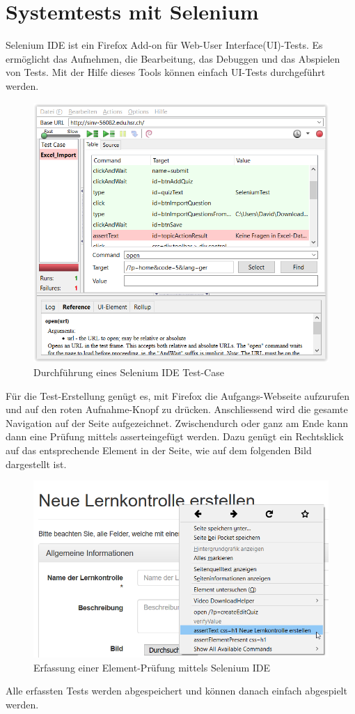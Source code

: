 \section{Systemtests mit Selenium}
Selenium IDE \cite{seleniumIDE} ist ein Firefox \cite{firefox} \gls{Add-on} für Web-\gls{User Interface}(UI)-Tests. Es ermöglicht das Aufnehmen, die Bearbeitung, das Debuggen und das Abspielen von Tests.
Mit der Hilfe dieses Tools können einfach \acrshort{UI}-Tests durchgeführt werden.

\begin{figure}[H]
	\centering
	\includegraphics[width=.5\textwidth]{Images/seleniumTest.PNG}
	\caption{Durchführung eines Selenium IDE Test-Case}
\end{figure}

Für die Test-Erstellung genügt es, mit Firefox die Aufgangs-Webseite aufzurufen und auf den roten Aufnahme-Knopf zu drücken. Anschliessend wird die gesamte Navigation auf der Seite aufgezeichnet. Zwischendurch oder ganz am Ende kann dann eine Prüfung mittels \glqq assert\grqq eingefügt werden. Dazu genügt ein Rechtsklick auf das entsprechende Element in der Seite, wie auf dem folgenden Bild dargestellt ist.

\begin{figure}[H]
	\centering
	\includegraphics[width=.5\textwidth]{Images/seleniumIDE_Assert.PNG}
	\caption{Erfassung einer Element-Prüfung mittels Selenium IDE}
\end{figure}

Alle erfassten Tests werden abgespeichert und können danach einfach abgespielt werden.

